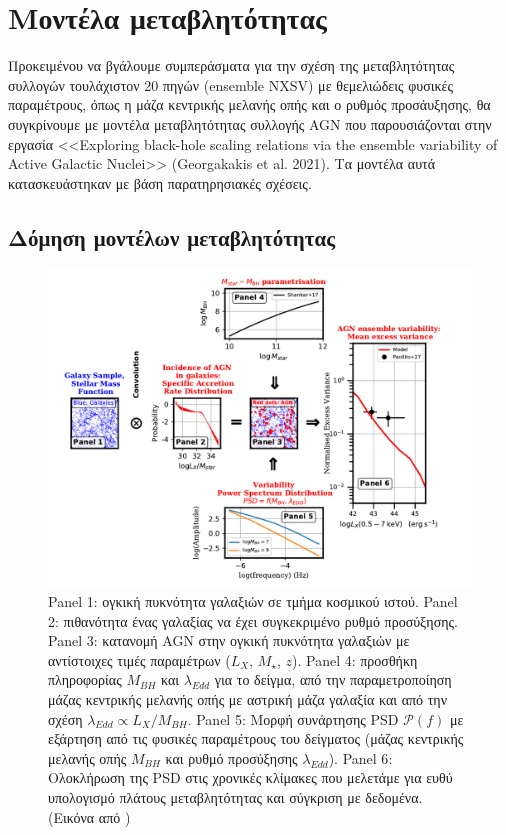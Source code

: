 \chapter{Μοντέλα μεταβλητότητας}

Προκειμένου να βγάλουμε συμπεράσματα για την σχέση της μεταβλητότητας συλλογών τουλάχιστον 20 πηγών (\textlatin{ensemble NXSV}) με θεμελιώδεις φυσικές παραμέτρους, όπως η μάζα κεντρικής μελανής οπής και ο ρυθμός προσάυξησης, θα συγκρίνουμε με μοντέλα μεταβλητότητας συλλογής \textlatin{AGN} που παρουσιάζονται στην εργασία <<\textlatin{Exploring black-hole scaling relations via the ensemble variability of Active Galactic Nuclei}>> (\textlatin{Georgakakis et al. 2021})\cite{VAR}. Τα μοντέλα αυτά κατασκευάστηκαν με βάση παρατηρησιακές σχέσεις.

\section{Δόμηση μοντέλων μεταβλητότητας}

\begin{figure}
 \begin{center}
 \includegraphics[width=1.1\linewidth]{Figures/ModelConstruction.png}
 \caption{\textlatin{Panel 1}: ογκική πυκνότητα γαλαξιών σε τμήμα κοσμικού ιστού. \textlatin{Panel 2}: πιθανότητα ένας γαλαξίας να έχει συγκεκριμένο ρυθμό προσύξησης. \textlatin{Panel 3}: κατανομή \textlatin{AGN} στην ογκική πυκνότητα γαλαξιών με αντίστοιχες τιμές παραμέτρων ($L_X$, $M_{\star}$, $z$).
 \textlatin{Panel 4}: προσθήκη πληροφορίας $M_{BH}$ και  $\lambda_{Edd}$ για το δείγμα, από την παραμετροποίηση μάζας κεντρικής μελανής οπής με αστρική μάζα γαλαξία και από την σχέση $\lambda_{Edd} \propto L_X/M_{BH}$. 
 \textlatin{Panel 5}: Μορφή συνάρτησης \textlatin{PSD} $\mathcal{P}(f)$ με εξάρτηση από τις φυσικές παραμέτρους του δείγματος (μάζας κεντρικής μελανής οπής $M_{BH}$ και ρυθμό προσύξησης $\lambda_{Edd}$).  
 \textlatin{Panel 6}: Ολοκλήρωση της \textlatin{PSD} στις χρονικές κλίμακες που μελετάμε για ευθύ υπολογισμό πλάτους μεταβλητότητας και σύγκριση με δεδομένα. (Εικόνα από \cite{VAR})}
 \label{fig:ModelConstruction}
 \end{center}
 \end{figure}

